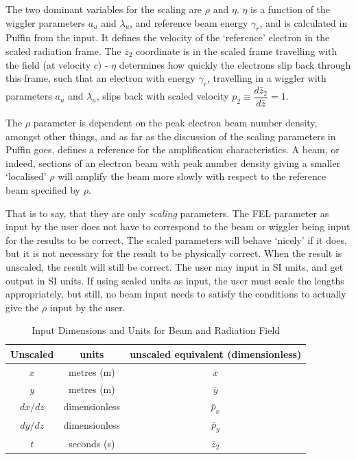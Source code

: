 \documentclass[12pt]{article}%
\begin{document}
The two dominant variables for the scaling are $\rho$ and $\eta$. $\eta$ is a function of the wiggler parameters $a_u$ and $\lambda_u$, and reference beam energy $\gamma_r$, and is calculated in Puffin from the input. It defines the velocity of the `reference' electron in the scaled radiation frame. The $\bar{z}_2$ coordinate is in the scaled frame travelling with the field (at velocity $c$) - $\eta$ determines how quickly the electrons slip back through this frame, such that an electron with energy $\gamma_r$, travelling in a wiggler with parameters $a_u$ and $\lambda_u$, slips back with scaled velocity $p_2 \equiv \dfrac{d \bar{z}_2}{d\bar{z}} = 1$.

The $\rho$ parameter is dependent on the peak electron beam number density, amongst other things, and as far as the discussion of the scaling parameters in Puffin goes, defines a reference for the amplification characteristics. A beam, or indeed, sections of an electron beam with peak number density giving a smaller `localised' $\rho$ will amplify the beam more slowly with respect to the reference beam specified by $\rho$.

That is to say, that they are only \textit{scaling} parameters. The FEL parameter as input by the user does not have to correspond to the beam or wiggler being input for the results to be correct. The scaled parameters will behave `nicely' if it does, but it is not necessary for the result to be physically correct. When the result is unscaled, the result will still be correct. The user may input in SI units, and get output in SI units. If using scaled units as input, the user must scale the lengths appropriately, but still, no beam input needs to satisfy the conditions to actually give the $\rho$ input by the user.






\begin{table}
\centering
\caption[Input Units]{Input Dimensions and Units for Beam and Radiation Field}
\begin{tabular}{|  c   | c  |   c   |}
\hline
Unscaled & units & unscaled equivalent (dimensionless) \\
\hline
$x$ & metres (m) & $\bar{x}$ \\
\hline
$y$ & metres (m) & $\bar{y}$ \\
\hline
$dx/dz$ & dimensionless & $\bar{p}_x$ \\
\hline
$dy/dz$ & dimensionless & $\bar{p}_y$ \\
\hline
$t$ & seconds (s) & $\bar{z}_2$ \\
\hline
\end{tabular}
\label{table}
\vspace*{-\baselineskip}
\end{table}
\end{document}
